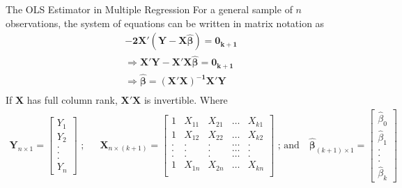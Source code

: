 \documentclass[notes,10pt, aspectratio=169]{beamer}
\begin{document}
\begin{frame}{The OLS Estimator in Multiple Regression}
For a general sample of $n$ observations, the system of equations can be written in matrix notation as
\begin{eqnarray*}
    \bm{-2X'(Y-X\hat{\beta})=0_{k+1}}\\
    \Rightarrow \bm{X'Y-X'X\hat{\beta}=0_{k+1}}\\
    \Rightarrow \bm{\hat{\beta}=(X'X)^{-1}X'Y}\\
\end{eqnarray*}
If $\bm{X}$ has full column rank, $\bm{X'X}$ is invertible.
Where
\begin{eqnarray*}
    \bm{Y}_{n\times1}=\begin{bmatrix}
Y_1\\
Y_2\\
.\\
.\\
.\\
Y_n
\end{bmatrix}
\text{~;~~~~~}   \bm{X}_{n\times (k+1)}=\begin{bmatrix}
1 & X_{11} & X_{21} & \dots & X_{k1}\\
1 & X_{12} & X_{22} & \dots & X_{k2}\\
. & . & . & \dots & .\\
. & . & . & \dots & .\\
. & . & . & \dots & .\\
1 & X_{1n} & X_{2n} & \dots & X_{kn}\\
\end{bmatrix}
\text{~;~and~~~} \bm{\hat{\beta}}_{(k+1)\times1}=\begin{bmatrix}
\hat{\beta}_0\\
\hat{\beta}_1\\
.\\
.\\
.\\
\hat{\beta}_k
\end{bmatrix}
\end{eqnarray*}
\end{frame}
\end{document}
